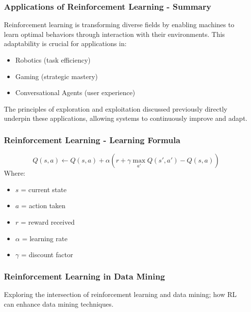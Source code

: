 \documentclass[aspectratio=169]{beamer}
\begin{document}
\begin{frame}[fragile]
    \frametitle{Applications of Reinforcement Learning - Summary}
    Reinforcement learning is transforming diverse fields by enabling machines to learn optimal behaviors through interaction with their environments. This adaptability is crucial for applications in:
    
    \begin{itemize}
        \item Robotics (task efficiency)
        \item Gaming (strategic mastery)
        \item Conversational Agents (user experience)
    \end{itemize}
    
    The principles of exploration and exploitation discussed previously directly underpin these applications, allowing systems to continuously improve and adapt.
\end{frame}

\begin{frame}[fragile]
    \frametitle{Reinforcement Learning - Learning Formula}
    \begin{equation}
        Q(s, a) \gets Q(s, a) + \alpha \left( r + \gamma \max_{a'} Q(s', a') - Q(s, a) \right)
    \end{equation}
    Where:
    \begin{itemize}
        \item \( s \) = current state
        \item \( a \) = action taken
        \item \( r \) = reward received
        \item \( \alpha \) = learning rate
        \item \( \gamma \) = discount factor
    \end{itemize}
\end{frame}

\begin{frame}[fragile]
    \frametitle{Reinforcement Learning in Data Mining}
    Exploring the intersection of reinforcement learning and data mining; how RL can enhance data mining techniques.
\end{frame}
\end{document}
